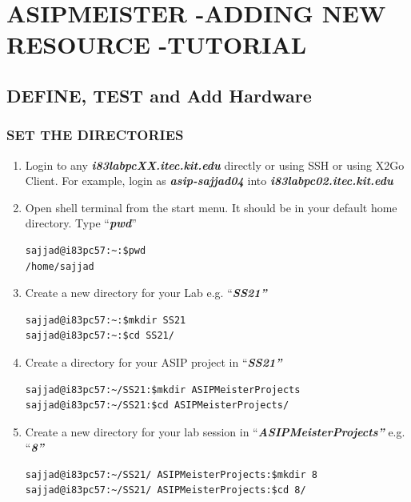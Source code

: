 \chapter*{ASIPMEISTER -ADDING NEW RESOURCE -TUTORIAL}
\section*{DEFINE, TEST and Add Hardware}
\subsection{SET THE DIRECTORIES}
\begin{enumerate}
\item Login to any \emph{\textbf{i83labpcXX.itec.kit.edu}} directly or using SSH or using X2Go Client. For example, login as \emph{\textbf{asip-sajjad04}} into \emph{\textbf{i83labpc02.itec.kit.edu}}
\item Open shell terminal from the start menu. It should be in your default home directory. Type ``\emph{\textbf{pwd}}''
\begin{lstlisting}
sajjad@i83pc57:~:$pwd
/home/sajjad
\end{lstlisting}
\item Create a new directory for your Lab e.g. ``\emph{\textbf{SS21''}}
\begin{lstlisting}
sajjad@i83pc57:~:$mkdir SS21
sajjad@i83pc57:~:$cd SS21/
\end{lstlisting}
\item Create a directory for your ASIP project in ``\emph{\textbf{SS21''}}
\begin{lstlisting}
sajjad@i83pc57:~/SS21:$mkdir ASIPMeisterProjects
sajjad@i83pc57:~/SS21:$cd ASIPMeisterProjects/
\end{lstlisting}
\item Create a new directory for your lab session in ``\emph{\textbf{ASIPMeisterProjects''}} e.g. ``\emph{\textbf{8''}}
\begin{lstlisting}
sajjad@i83pc57:~/SS21/ ASIPMeisterProjects:$mkdir 8
sajjad@i83pc57:~/SS21/ ASIPMeisterProjects:$cd 8/
\end{lstlisting}
\end{enumerate}
